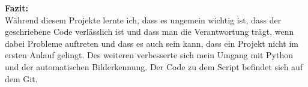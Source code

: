 \noindent
\textbf{Fazit:}
\\ 

\noindent
Während diesem Projekte lernte ich, dass es ungemein wichtig ist, dass der geschriebene Code verlässlich ist und dass man die Verantwortung trägt, wenn dabei Probleme auftreten und dass es auch sein kann, dass ein Projekt nicht im ersten Anlauf gelingt. Des weiteren verbesserte sich mein Umgang mit Python und der automatischen Bilderkennung. Der Code zu dem Script befindet sich auf dem Git. 





